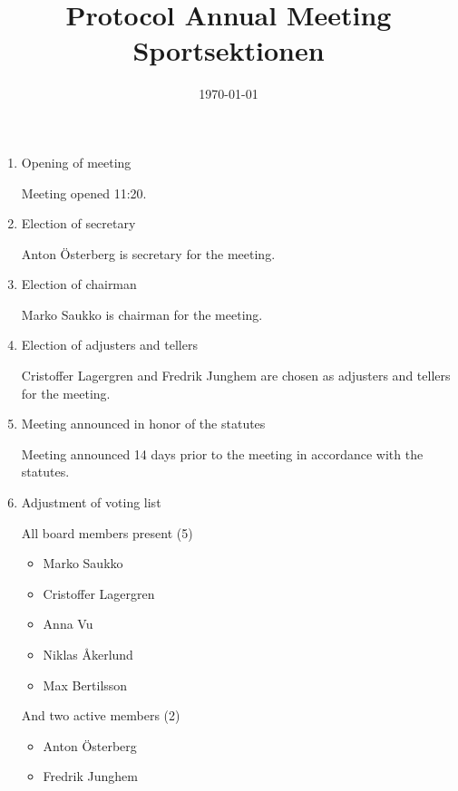\documentclass[12pt,a4paper]{article}
\begin{document}
	\title{\Huge Protocol Annual Meeting Sportsektionen}
	\date{\today}
	\maketitle

	\null
	\vfill

	\clearpage

	\begin{enumerate}

		\item Opening of meeting
		
			Meeting opened 11:20.
			
		\item Election of secretary
		
			Anton Österberg is secretary for the meeting.
			
		\item Election of chairman
		
			Marko Saukko is chairman for the meeting.
			
		\item Election of adjusters and tellers
		
			Cristoffer Lagergren and Fredrik Junghem are chosen as adjusters and tellers for the meeting.
			
		\item Meeting announced in honor of the statutes
		
			Meeting announced 14 days prior to the meeting in accordance with the statutes.
			
		\item Adjustment of voting list
		
			All board members present (5)
			\begin{itemize}
				\item Marko Saukko
				\item Cristoffer Lagergren
				\item Anna Vu
				\item Niklas Åkerlund
				\item Max Bertilsson
			\end{itemize}
				
			And two active members (2)
			\begin{itemize}
				\item Anton Österberg
				\item Fredrik Junghem
			\end{itemize}
				

\end{enumerate}
\end{document}
